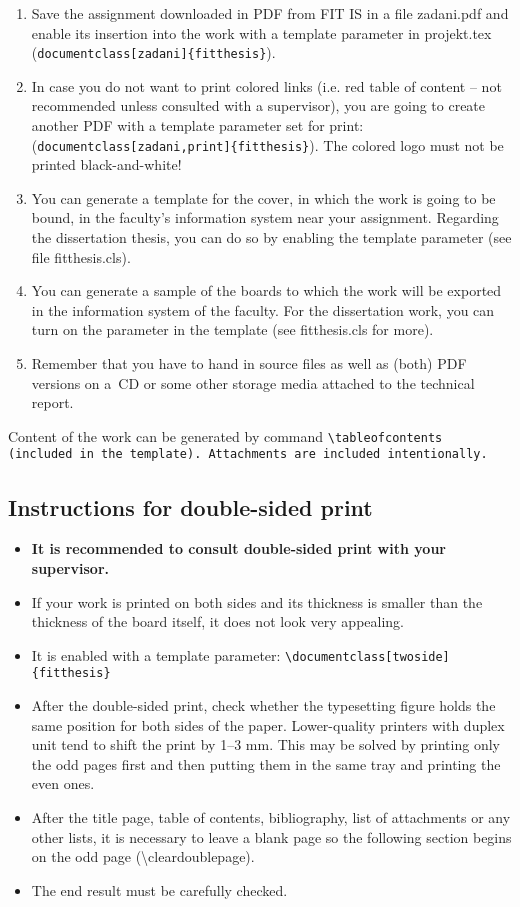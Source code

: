 \begin{enumerate}
  \item Save the assignment downloaded in PDF from FIT IS in a file zadani.pdf and enable its insertion into the work with a template parameter in projekt.tex (\verb|documentclass[zadani]{fitthesis}|).
  \item In case you do not want to print colored links (i.e. red table of content -- not recommended unless consulted with a supervisor), you are going to create another PDF with a template parameter set for print: (\verb|documentclass[zadani,print]{fitthesis}|). The colored logo must not be printed black-and-white!
  \item You can generate a template for the cover, in which the work is going to be bound, in the faculty's information system near your assignment. Regarding the dissertation thesis, you can do so by enabling the template parameter (see file fitthesis.cls).
  \item You can generate a sample of the boards to which the work will be exported in the information system of the faculty. For the dissertation work, you can turn on the parameter in the template (see fitthesis.cls for more).
  \item Remember that you have to hand in source files as well as (both) PDF versions on a~CD or some other storage media attached to the technical report.
\end{enumerate}

Content of the work can be generated by command \tt \textbackslash tableofcontents \rm (included in the template). Attachments are included intentionally.

\subsection*{Instructions for double-sided print}
\begin{itemize}
\item \textbf{It is recommended to consult double-sided print with your supervisor.}
\item If your work is printed on both sides and its thickness is smaller than the thickness of the board itself, it does not look very appealing. 
\item It is enabled with a template parameter: \verb|\documentclass[twoside]{fitthesis}|
\item After the double-sided print, check whether the typesetting figure holds the same position for both sides of the paper. Lower-quality printers with duplex unit tend to shift the print by 1--3 mm. This may be solved by printing only the odd pages first and then putting them in the same tray and printing the even ones.
\item After the title page, table of contents, bibliography, list of attachments or any other lists, it is necessary to leave a blank page so the following section begins on the odd page (\textbackslash cleardoublepage).
\item The end result must be carefully checked.
\end{itemize}

